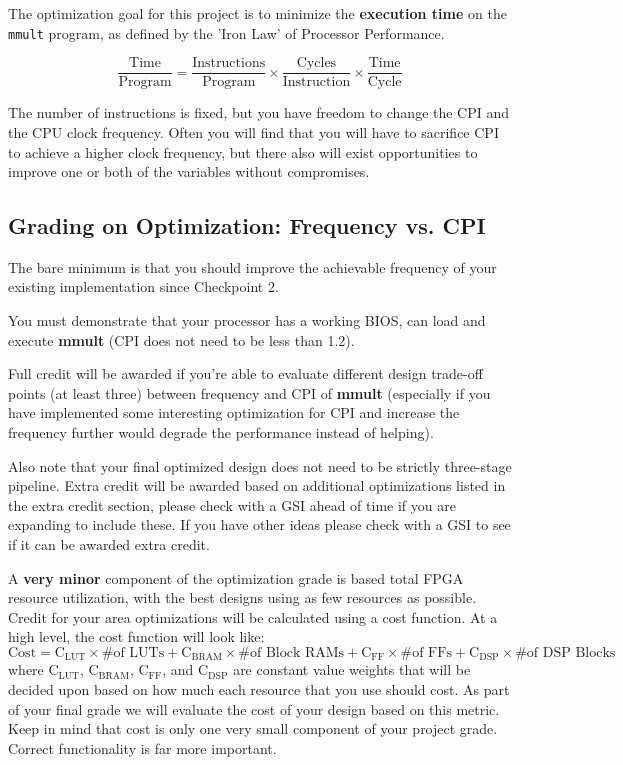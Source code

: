 \documentclass[11pt]{article}
\begin{document}
The optimization goal for this project is to minimize the \textbf{execution time} on the \verb|mmult| program, as defined by the 'Iron Law' of Processor Performance.

\begin{equation*}
\frac{\text{Time}}{\text{Program}} = \frac{\text{Instructions}}{\text{Program}} \times \frac{\text{Cycles}}{\text{Instruction}} \times \frac{\text{Time}}{\text{Cycle}}
\end{equation*}

The number of instructions is fixed, but you have freedom to change the CPI and the CPU clock frequency.
Often you will find that you will have to sacrifice CPI to achieve a higher clock frequency, but there also will exist opportunities to improve one or both of the variables without compromises.

\subsection{Grading on Optimization: Frequency vs. CPI}
The bare minimum is that you should improve the achievable frequency of your existing implementation since Checkpoint 2.

You must demonstrate that your processor has a working BIOS, can load and execute \textbf{mmult} (CPI does not need to be less than 1.2).

Full credit will be awarded if you're able to evaluate different design trade-off points (at least three) between frequency and CPI of \textbf{mmult} (especially if you have implemented some interesting optimization for CPI and increase the frequency further would degrade the performance instead of helping).

Also note that your final optimized design does not need to be strictly three-stage pipeline. Extra credit will be awarded based on additional optimizations listed in the extra credit section, please check with a GSI ahead of time if you are expanding to include these. If you have other ideas please check with a GSI to see if it can be awarded extra credit.

A \textbf{very minor} component of the optimization grade is based total FPGA resource utilization, with the best designs using as few resources as possible.
Credit for your area optimizations will be calculated using a cost function.
At a high level, the cost function will look like:
\begin{equation*}
\mathrm{Cost}=\mathrm{C_{LUT}} \times \text{\# of LUTs} + \mathrm{C_{BRAM}} \times \text{\# of Block RAMs} + \mathrm{C_{FF}} \times \text{\# of FFs} + \mathrm{C_{DSP}} \times \text{\# of DSP Blocks}
\end{equation*}
where $\mathrm{C_{LUT}}$, $\mathrm{C_{BRAM}}$, $\mathrm{C_{FF}}$, and $\mathrm{C_{DSP}}$ are constant value weights that will be decided upon based on how much each resource that you use should cost. As part of your final grade we will evaluate the cost of your design based on this metric. Keep in mind that cost is only one very small component of your project grade. Correct functionality is far more important.
\end{document}
